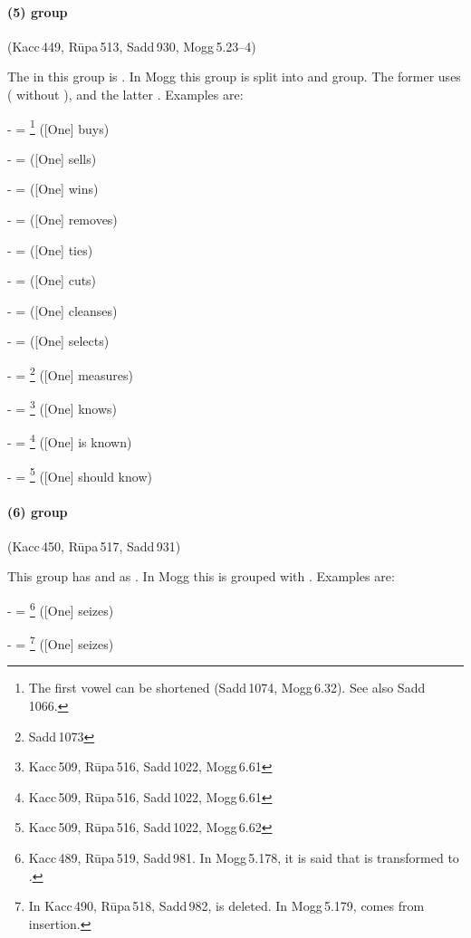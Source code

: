 \paragraph*{(5)  group} (Kacc\,449, R\=upa\,513, Sadd\,930, Mogg\,5.23--4)\label{pacca:naa}\label{pacca:knaa}\label{pacca:kdnaa}\par
The  in this group is . In Mogg this group is split into  and  group. The former uses  ( without ), and the latter . Examples are:\par
-  = \footnote{The first vowel can be shortened (Sadd\,1074, Mogg\,6.32). See also Sadd\,1066.} ([One] buys)\par
-  =  ([One] sells)\par
-  =  ([One] wins)\par
-  =  ([One] removes)\par
-  =  ([One] ties)\par
-  =  ([One] cuts)\par
-  =  ([One] cleanses)\par
-  =  ([One] selects)\par
-  = \footnote{Sadd\,1073} ([One] measures)\par
-  = \footnote{Kacc\,509, R\=upa\,516, Sadd\,1022, Mogg\,6.61} ([One] knows)\par
-  = \footnote{Kacc\,509, R\=upa\,516, Sadd\,1022, Mogg\,6.61} ([One] is known)\par
-  = \footnote{Kacc\,509, R\=upa\,516, Sadd\,1022, Mogg\,6.62} ([One] should know)\par

\paragraph*{(6)  group} (Kacc\,450, R\=upa\,517, Sadd\,931)\label{pacca:ppa}\label{pacca:dnhaa}\par
This group has  and  as . In Mogg this is grouped with . Examples are:\par
-  = \footnote{Kacc\,489, R\=upa\,519, Sadd\,981. In Mogg\,5.178, it is said that  is transformed to .} ([One] seizes)\par
-  = \footnote{In Kacc\,490, R\=upa\,518, Sadd\,982,  is deleted. In Mogg\,5.179,  comes from  insertion.} ([One] seizes)\par

